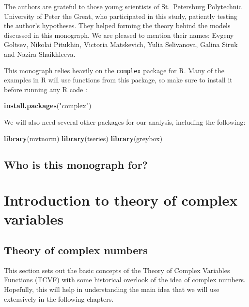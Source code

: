 \documentclass[
]{book}
\newenvironment{Shaded}{\begin{snugshade}}{\end{snugshade}}
\newcommand{\KeywordTok}[1]{\textcolor[rgb]{0.13,0.29,0.53}{\textbf{#1}}}
\newcommand{\NormalTok}[1]{#1}
\newcommand{\StringTok}[1]{\textcolor[rgb]{0.31,0.60,0.02}{#1}}
\begin{document}
The authors are grateful to those young scientists of St.~Petersburg Polytechnic University of Peter the Great, who participated in this study, patiently testing the author's hypotheses. They helped forming the theory behind the models discussed in this monograph. We are pleased to mention their names: Evgeny Goltsev, Nikolai Pitukhin, Victoria Matskevich, Yulia Selivanova, Galina Siruk and Nazira Shaikhleeva.

This monograph relies heavily on the \texttt{complex} package for R. Many of the examples in R will use functions from this package, so make sure to install it before running any R code \citep{R-complex}:

\begin{Shaded}
\begin{Highlighting}[]
\KeywordTok{install.packages}\NormalTok{(}\StringTok{"complex"}\NormalTok{)}
\end{Highlighting}
\end{Shaded}

We will also need several other packages for our analysis, including the following:

\begin{Shaded}
\begin{Highlighting}[]
\KeywordTok{library}\NormalTok{(mvtnorm)}
\KeywordTok{library}\NormalTok{(tseries)}
\KeywordTok{library}\NormalTok{(greybox)}
\end{Highlighting}
\end{Shaded}

\hypertarget{who-is-this-monograph-for}{%
\section*{Who is this monograph for?}\label{who-is-this-monograph-for}}

\hypertarget{intro}{%
\chapter{Introduction to theory of complex variables}\label{intro}}

\hypertarget{theoryOfComplexNumbers}{%
\section{Theory of complex numbers}\label{theoryOfComplexNumbers}}

This section sets out the basic concepts of the Theory of Complex Variables Functions (TCVF) with some historical overlook of the idea of complex numbers. Hopefully, this will help in understanding the main idea that we will use extensively in the following chapters.
\end{document}
